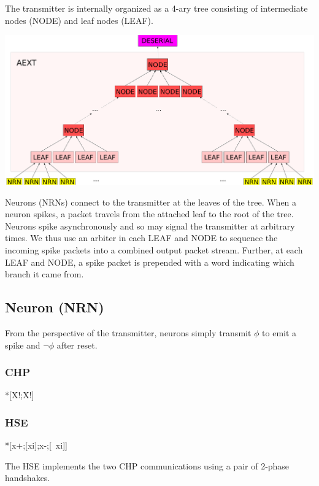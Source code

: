 \documentclass{article}
\begin{document}
The transmitter is internally organized as a 4-ary tree consisting of intermediate
nodes (NODE) and leaf nodes (LEAF).
\begin{center}
    \includegraphics[width=.7\textwidth]{img/aext.pdf}
\end{center}
Neurons (NRNs) connect to the transmitter at the leaves of the tree.
When a neuron spikes, a packet travels from the attached leaf to the root of 
the tree. Neurons spike asynchronously and so may signal the transmitter at 
arbitrary times. We thus use an arbiter in each LEAF and NODE to sequence the 
incoming spike packets into a combined output packet stream. Further, at each 
LEAF and NODE, a spike packet is prepended with a word indicating which 
branch it came from.

\subsection{Neuron (NRN) \label{sec:AEXT_NRN}}

From the perspective of the transmitter, neurons simply transmit $\phi$ to 
emit a spike and $\neg\phi$ after reset.

\subsubsection*{CHP}

\begin{csp}
*[X!\phi;X!\neg\phi]
\end{csp}

\subsubsection*{HSE}

\begin{hse}
*[x\phi+;[xi];x\phi-;[~xi]]
\end{hse}

\noindent
The HSE implements the two CHP communications using a pair of 2-phase handshakes.
\end{document}
